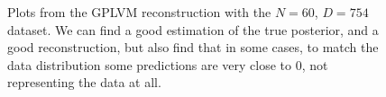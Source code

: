 \begin{figure}
\begin{subfigure}[r]{0.3\textwidth}
	\end{subfigure}
	\caption[Y-$\hat{Y}$ pair plots for $N=60$, $D=125$ VN-data with the GPLVM model]{Plots from the GPLVM reconstruction with the $N=60$, $D=754$ dataset. We can find a good estimation of the true posterior, and a good reconstruction, but also find that in some cases, to match the data distribution some predictions are very close to 0, not representing the data at all.}
	\label{fig:gplvm_vcr_pairs}
\end{figure}